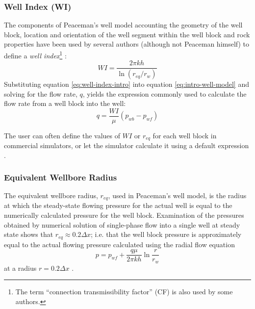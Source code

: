 \subsubsection{Well Index (WI)} %
\label{ssub:well_index_}
The components of Peaceman's well model accounting the geometry of the well block, location and orientation of the well segment within the well block and rock properties have been used by several authors (although not Peaceman himself) to define a \emph{well index}\footnote{The term ``connection transmissibility factor'' (CF) is also used by some authors\cite{Peaceman2003New,Schlumberger2013Eclipse}.} \cite{Wolfsteiner2003Calculation}:
\begin{equation}
    \label{eq:well-index-intro}
    WI = \frac{2\pi kh}{\ln \left(r_{eq}/r_{w}\right)}
\end{equation}
Substituting equation \eqref{eq:well-index-intro} into equation \eqref{eq:intro-well-model} and solving for the flow rate, $q$, yields the expression commonly used to calculate the flow rate from a well block into the well:
\begin{equation}
    \label{eq:wolfsteiner-well-index-multiple-blocks}
    q = \frac{WI}{\mu} \left( p_{wb} - p_{wf} \right)
\end{equation}

The user can often define the values of $WI$ or $r_{eq}$ for each well block in commercial simulators, or let the simulator calculate it using a default expression \cite{Peaceman2003New}.

\subsubsection{Equivalent Wellbore Radius} %
\label{ssub:equivalent_wellbore_radius}
The equivalent wellbore radius, $r_{eq}$, used in Peaceman's well model, is the radius at which the steady-state flowing pressure for the actual well is equal to the numerically calculated pressure for the well block. Examination of the pressures obtained by numerical solution of single-phase flow into a single well at steady state shows that $r_{eq} \approx 0.2 \Delta x$; i.e. that the well block pressure is approximately equal to the actual flowing pressure calculated using the radial flow equation \cite{Dake1978Developments}
\begin{equation}
    p = p_{wf} + \frac{q\mu}{2\pi kh} \ln{\frac{r}{r_w}}
\end{equation}
 at a radius $r = 0.2 \Delta x$ \cite{Peaceman1978Interpretation}.

